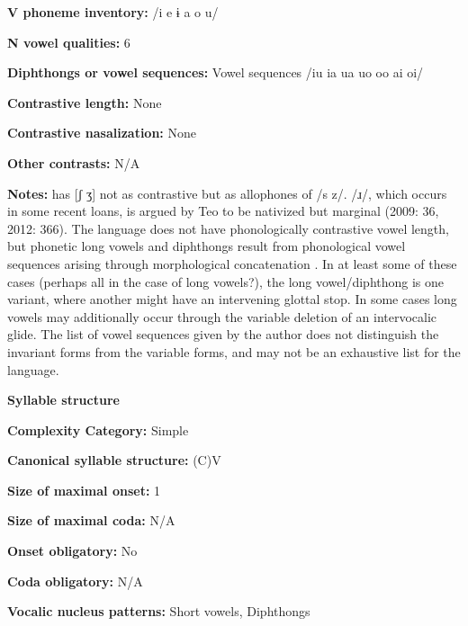 \textbf{V phoneme inventory:} /i e ɨ a o u/



\textbf{N vowel qualities:} 6



\textbf{Diphthongs or vowel sequences:} Vowel sequences /iu ia ua uo oo ai oi/



\textbf{Contrastive length:} None



\textbf{Contrastive nasalization:} None



\textbf{Other contrasts:} N/A



\textbf{Notes:} \citet{Sreedhar1980} has [ʃ ʒ] not as contrastive but as allophones of /s z/. /ɹ/, which occurs in some recent loans, is argued by Teo to be nativized but marginal (2009: 36, 2012: 366). The language does not have phonologically contrastive vowel length, but phonetic long vowels and diphthongs result from phonological vowel sequences arising through morphological concatenation \citep[58-9]{Teo2009}. In at least some of these cases (perhaps all in the case of long vowels?), the long vowel/diphthong is one variant, where another might have an intervening glottal stop. In some cases long vowels may additionally occur through the variable deletion of an intervocalic glide. The list of vowel sequences given by the author does not distinguish the invariant forms from the variable forms, and may not be an exhaustive list for the language.



\textbf{Syllable structure}



\textbf{Complexity Category:} Simple



\textbf{Canonical syllable structure:} (C)V \citep[57-64]{Teo2009}



\textbf{Size of maximal onset:} 1



\textbf{Size of maximal coda:} N/A



\textbf{Onset obligatory:} No



\textbf{Coda obligatory:} N/A



\textbf{Vocalic nucleus patterns:} Short vowels, Diphthongs




